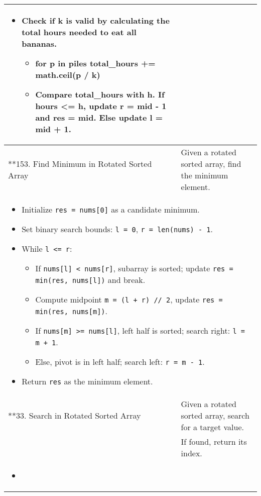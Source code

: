 \begin{summary}
\begin{center}
\begin{tabular}{ll}
{\begin{itemize}
                    \item Check if k is valid by calculating the total hours needed to eat all bananas.
                    \begin{itemize}
                        \item for p in piles total\_hours += math.ceil(p / k)
                        \item Compare total\_hours with h. If hours <= h, update r = mid - 1 and res = mid. Else update l = mid + 1.
                    \end{itemize}
                \end{itemize}
            } \\
            \midrule 
            **153. Find Minimum in Rotated Sorted Array & Given a rotated sorted array, find the minimum element. \\
            \multicolumn{2}{p{\linewidth}}{
                \begin{itemize}
                    \item Initialize \texttt{res = nums[0]} as a candidate minimum.
                    \item Set binary search bounds: \texttt{l = 0}, \texttt{r = len(nums) - 1}.
                    \item While \texttt{l <= r}:
                    \begin{itemize}
                        \item If \texttt{nums[l] < nums[r]}, subarray is sorted; update \texttt{res = min(res, nums[l])} and break.
                        \item Compute midpoint \texttt{m = (l + r) // 2}, update \texttt{res = min(res, nums[m])}.
                        \item If \texttt{nums[m] >= nums[l]}, left half is sorted; search right: \texttt{l = m + 1}.
                        \item Else, pivot is in left half; search left: \texttt{r = m - 1}.
                    \end{itemize}
                    \item Return \texttt{res} as the minimum element.
                \end{itemize}                
            } \\
            \midrule
            **33. Search in Rotated Sorted Array & Given a rotated sorted array, search for a target value. \\
            & If found, return its index. \\
            \multicolumn{2}{p{\linewidth}}{
                \begin{itemize}
                    \item 
                \end{itemize}
            } \\
            \midrule
            \bottomrule
        \end{tabular}
    \end{center}
\end{summary}
